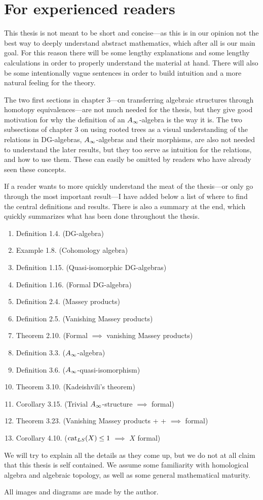 

\section{For experienced readers}

This thesis is not meant to be short and concise---as this is in our opinion not the best way to deeply understand abstract mathematics, which after all is our main goal. For this reason there will be some lengthy explanations and some lengthy calculations in order to properly understand the material at hand. There will also be some intentionally vague sentences in order to build intuition and a more natural feeling for the theory. 

The two first sections in chapter 3---on transferring algebraic structures through homotopy equivalences---are not much needed for the thesis, but they give good motivation for why the definition of an $A_{\infty}$-algebra is the way it is. The two subsections of chapter 3 on using rooted trees as a visual understanding of the relations in DG-algebras, $A_{\infty}$-algebras and their morphisms, are also not needed to understand the later results, but they too serve as intuition for the relations, and how to use them. These can easily be omitted by readers who have already seen these concepts. 

If a reader wants to more quickly understand the meat of the thesis---or only go through the most important result---I have added below a list of where to find the central definitions and results. There is also a summary at the end, which quickly summarizes what has been done throughout the thesis. 

\begin{enumerate}
	\item Definition 1.4. (DG-algebra)
	\item Example 1.8. (Cohomology algebra)
	\item Definition 1.15. (Quasi-isomorphic DG-algebras)
	\item Definition 1.16. (Formal DG-algebra)
	\item Definition 2.4. (Massey products)
	\item Definition 2.5. (Vanishing Massey products)
	\item Theorem 2.10. (Formal $\implies$ vanishing Massey products)
	\item Definition 3.3. ($A_{\infty}$-algebra)
	\item Definition 3.6. ($A_{\infty}$-quasi-isomorphism)
	\item Theorem 3.10. (Kadeishvili's theorem)
	\item Corollary 3.15. (Trivial $A_{\infty}$-structure $\implies$ formal)
	\item Theorem 3.23. (Vanishing Massey products + + $\implies$ formal)
	\item Corollary 4.10. ($\text{cat}_{LS}(X)\leq 1$ $\implies$ $X$ formal)
\end{enumerate}

We will try to explain all the details as they come up, but we do not at all claim that this thesis is self contained. We assume some familiarity with homological algebra and algebraic topology, as well as some general mathematical maturity. 

All images and diagrams are made by the author. 